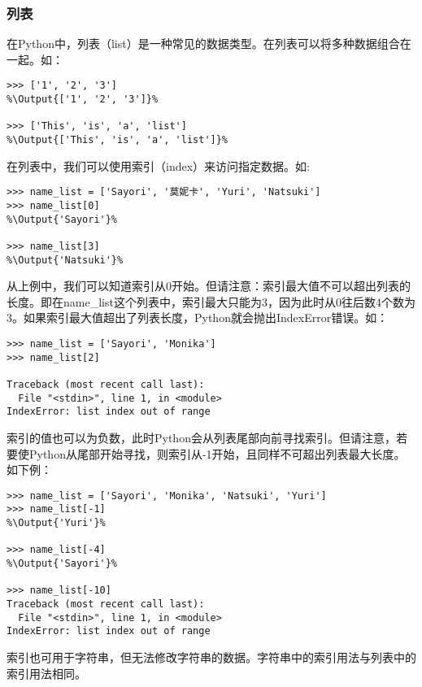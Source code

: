 \subsubsection{列表}

在Python中，列表（list）是一种常见的数据类型。在列表可以将多种数据组合在一起。如：
\begin{lstlisting}
>>> ['1', '2', '3']
%\Output{['1', '2', '3']}%

>>> ['This', 'is', 'a', 'list']
%\Output{['This', 'is', 'a', 'list']}%

\end{lstlisting}


在列表中，我们可以使用索引（index）来访问指定数据。如:
\begin{lstlisting}
>>> name_list = ['Sayori', '莫妮卡', 'Yuri', 'Natsuki']
>>> name_list[0]
%\Output{'Sayori'}%

>>> name_list[3]
%\Output{'Natsuki'}%
\end{lstlisting}

\begin{Warning}
    从上例中，我们可以知道索引从0开始。但请注意：索引最大值不可以超出列表的长度。即在name\_list这个列表中，索引最大只能为3，因为此时从0往后数4个数为3。如果索引最大值超出了列表长度，Python就会抛出IndexError错误。如：
    \begin{lstlisting}[numbers=none]
>>> name_list = ['Sayori', 'Monika']
>>> name_list[2]

Traceback (most recent call last):
  File "<stdin>", line 1, in <module>
IndexError: list index out of range
    \end{lstlisting}
\end{Warning}

\begin{ExtraKnowledge}
    索引的值也可以为负数，此时Python会从列表尾部向前寻找索引。但请注意，若要使Python从尾部开始寻找，则索引从-1开始，且同样不可超出列表最大长度。如下例：
    \begin{lstlisting}[numbers=none]
>>> name_list = ['Sayori', 'Monika', 'Natsuki', 'Yuri']
>>> name_list[-1]
%\Output{'Yuri'}%

>>> name_list[-4]
%\Output{'Sayori'}%

>>> name_list[-10]
Traceback (most recent call last):
  File "<stdin>", line 1, in <module>
IndexError: list index out of range
    \end{lstlisting}
\end{ExtraKnowledge}

\begin{ExtraKnowledge}
    索引也可用于字符串，但无法修改字符串的数据。字符串中的索引用法与列表中的索引用法相同。
\end{ExtraKnowledge}

